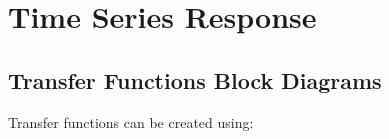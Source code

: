 \documentclass[12pt,letter]{article}
\begin{document}
%	
%	

	\setcounter{section}{3}	


\section{Time Series Response}

\subsection{Transfer Functions Block Diagrams}


Transfer functions can be created using:
\end{document}
